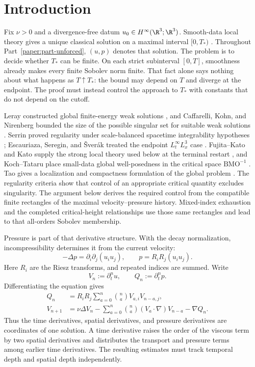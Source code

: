 \section{Introduction}
\label{u:sec:introduction}

Fix \(\nu>0\) and a divergence-free datum
\(u_0\in H^\infty(\R^3;\R^3)\).  Smooth-data local theory gives a unique
classical solution on a maximal interval \([0,T_*)\)
\cite{FujitaKato1964,Kato1984}.  Throughout Part~\ref{paper:part-unforced}, \((u,p)\) denotes that
solution.  The problem is to decide whether \(T_*\) can be finite.  On each strict
subinterval \([0,T]\), smoothness already makes every finite Sobolev norm
finite.  That fact alone says nothing about what happens as \(T\uparrow T_*\):
the bound may depend on \(T\) and diverge at the endpoint.  The proof must
instead control the approach to \(T_*\) with constants that do not depend on
the cutoff.

Leray constructed global finite-energy weak solutions \cite{Leray1934}, and
Caffarelli, Kohn, and Nirenberg bounded the size of the possible singular set
for suitable weak solutions \cite{CKN1982}.  Serrin proved regularity under
scale-balanced spacetime integrability hypotheses \cite{Serrin1962};
Escauriaza, Seregin, and \v{S}ver\'ak treated the endpoint
\(L^\infty_tL^3_x\) case \cite{ESS2003}.  Fujita--Kato and Kato supply the
strong local theory used below at the terminal restart
\cite{FujitaKato1964,Kato1984}, and Koch--Tataru place small-data
global well-posedness in the critical space \(\mathrm{BMO}^{-1}\)
\cite{KochTataru2001}.
Tao gives a localization and compactness formulation of the global problem
\cite{Tao2013}.  The regularity criteria show that control of an appropriate
critical quantity excludes singularity.  The argument below derives the
required control from the compatible finite rectangles of the maximal
velocity--pressure history.  Mixed-index exhaustion and the completed
critical-height relationships use those same rectangles and lead to that
all-orders Sobolev membership.

Pressure is part of that derivative structure.  With the decay normalization,
incompressibility determines it from the current velocity:
\[
 -\Delta p=\partial_i\partial_j(u_i u_j),
 \qquad
 p=R_iR_j(u_i u_j).
\]
Here \(R_i\) are the Riesz transforms, and repeated indices are summed.
Write
\[
 V_n:=\partial_t^nu,
 \qquad
 Q_n:=\partial_t^np.
\]
Differentiating the equation gives
\begin{align}
 Q_n
 &=R_iR_j\sum_{a=0}^{n}\binom naV_{a,i}V_{n-a,j},
 \label{u:eq:intro-pressure-recurrence}\\
 V_{n+1}
 &=\nu\Delta V_n
 -\sum_{a=0}^{n}\binom na(V_a\cdot\nabla)V_{n-a}
 -\nabla Q_n.
 \label{u:eq:intro-velocity-recurrence}
\end{align}
Thus the time derivatives, spatial derivatives, and pressure derivatives are
coordinates of one solution.  A time derivative raises the order of the
viscous term by two spatial derivatives and distributes the transport and
pressure terms among earlier time derivatives.  The resulting estimates must
track temporal depth and spatial depth independently.

